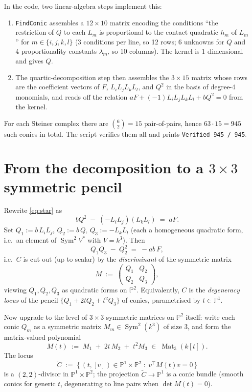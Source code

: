 \documentclass[11pt]{amsart}
\theoremstyle{plain}
\theoremstyle{definition}
\theoremstyle{remark}
\newcommand{\Sym}{\operatorname{Sym}}
\newcommand{\Mat}{\operatorname{Mat}}
\newcommand{\Pp}{\mathbb P}
\begin{document}
In the code, two linear-algebra steps implement this:
\begin{enumerate}
\item \texttt{FindConic} assembles a $12 \times 10$ matrix encoding the
  conditions ``the restriction of $Q$ to each $L_m$ is proportional to the
  contact quadratic $h_m$ of $L_m$'' for $m \in \{i,j,k,l\}$ (3 conditions
  per line, so 12 rows; 6 unknowns for $Q$ and 4 proportionality constants
  $\lambda_m$, so 10 columns). The kernel is $1$-dimensional and gives $Q$.
\item The quartic-decomposition step then assembles the $3 \times 15$ matrix
  whose rows are the coefficient vectors of $F$, $L_i L_j L_k L_l$, and
  $Q^2$ in the basis of degree-4 monomials, and reads off the relation
  $a F + (-1) L_i L_j L_k L_l + b Q^2 = 0$ from the kernel.
\end{enumerate}
For each Steiner complex there are $\binom{6}{2} = 15$ pair-of-pairs, hence
$63 \cdot 15 = 945$ such conics in total. The script verifies them all and
prints \texttt{Verified 945 / 945}.

\section{From the decomposition to a $3 \times 3$ symmetric pencil}
\label{sec:pencil}

Rewrite \eqref{eq:star} as
\[
  b Q^2 \;-\; (-L_i L_j)(L_k L_l) \;=\; a F.
\]
Set $Q_1 := b\, L_i L_j$, $Q_2 := b\, Q$, $Q_3 := -L_k L_l$ (each a
homogeneous quadratic form, i.e.\ an element of $\Sym^2 V^*$ with $V = k^3$).
Then
\[
  Q_1 Q_3 \;-\; Q_2^2 \;=\; -a b\, F,
\]
i.e.\ $C$ is cut out (up to scalar) by the \emph{discriminant} of the
symmetric matrix
\[
  M \;:=\; \begin{pmatrix} Q_1 & Q_2 \\ Q_2 & Q_3 \end{pmatrix},
\]
viewing $Q_1, Q_2, Q_3$ as quadratic forms on $\Pp^2$. Equivalently, $C$ is
the \emph{degeneracy locus} of the pencil $\{Q_1 + 2 t Q_2 + t^2 Q_3\}$ of
conics, parametrised by $t \in \Pp^1$.

Now upgrade to the level of $3 \times 3$ symmetric matrices on $\Pp^2$
itself: write each conic $Q_m$ as a symmetric matrix
$M_m \in \Sym^2(k^3)$ of size $3$, and form the matrix-valued polynomial
\[
  M(t) \;:=\; M_1 \;+\; 2 t\, M_2 \;+\; t^2 M_3 \;\in\; \Mat_3(k[t]).
\]
The locus
\[
  \widetilde C \;:=\; \bigl\{\, (t, [v]) \in \Pp^1 \times \Pp^2 \;:\;
   v^\top M(t) v = 0 \,\bigr\}
\]
is a $(2,2)$-divisor in $\Pp^1 \times \Pp^2$; the projection
$\widetilde C \to \Pp^1$ is a conic bundle (smooth conics for generic $t$,
degenerating to line pairs when $\det M(t) = 0$).
\end{document}

